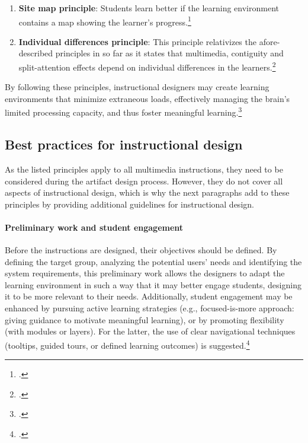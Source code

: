 \begin{enumerate}
    \item \textbf{Site map principle}: Students learn better if the learning environment contains a map showing the learner's progress.\footcites[Cf.][p.7]{MayerMultimediaLearning2009}
  \item \textbf{Individual differences principle}: This principle relativizes the afore-described principles in so far as it states that multimedia, contiguity and split-attention effects depend on individual differences in the learners.\footcites[Cf.][p.15]{MayerCognitiveTheoryMultimedia1999}
\end{enumerate}
By following these principles, instructional designers may create learning environments that minimize extraneous loads, effectively managing the brain's limited processing capacity, and thus foster meaningful learning.\footcites[Cf.][chapter 2, paragraph 6]{ClarkElearningscienceinstruction2016}

\subsection{Best practices for instructional design} \label{subsec:BestPracticesDesign}
As the listed principles apply to all multimedia instructions, they need to be considered during the artifact design process. However, they do not cover all aspects of instructional design, which is why the next paragraphs add to these principles by providing additional guidelines for instructional design.

\paragraph{Preliminary work and student engagement} Before the instructions are designed, their objectives should be defined. By defining the target group, analyzing the potential users' needs and identifying the system requirements, this preliminary work allows the designers to adapt the learning environment in such a way that it may better engage students, designing it to be more relevant to their needs. Additionally, student engagement may be enhanced by pursuing active learning strategies (e.g., focused-is-more approach: giving guidance to motivate meaningful learning), or by promoting flexibility (with modules or layers). For the latter, the use of clear navigational techniques (tooltips, guided tours, or defined learning outcomes) is suggested.\footcites[Cf.][p.202]{BlummerBestPracticesCreating2009}

